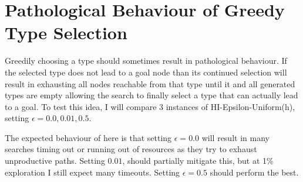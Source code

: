 \documentclass{article}
\theoremstyle{definition}
\begin{document}
\section{Pathological Behaviour of Greedy Type Selection}
Greedily choosing a type should sometimes result in pathological behaviour. If the selected type does not lead to a goal node than its continued selection will result in exhausting all nodes reachable from that type until it and all generated types are empty allowing the search to finally select a type that can actually lead to a goal. To test this idea, I will compare 3 instances of HI-Epsilon-Uniform(h), setting $\epsilon=0.0, 0.01, 0.5$.

The expected behaviour of here is that setting $\epsilon=0.0$ will result in many searches timing out or running out of resources as they try to exhaust unproductive paths. Setting $0.01$, should partially mitigate this, but at 1\% exploration I still expect many timeouts. Setting $\epsilon=0.5$ should perform the best.
\end{document}
